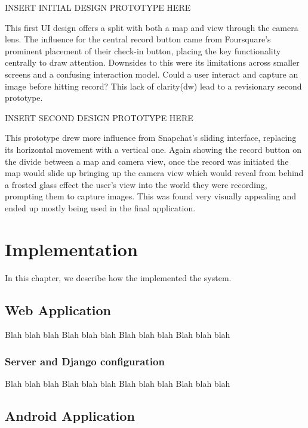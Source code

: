 \documentclass{l3proj}
\begin{document}
INSERT INITIAL DESIGN PROTOTYPE HERE

This first UI design offers a split with both a map and view through the camera
lens. The influence for the central record button came from Foursquare’s
prominent placement of their check-in button, placing the key functionality
centrally to draw attention. Downsides to this were its limitations across
smaller screens and a confusing interaction model. Could a user interact and
capture an image before hitting record? This lack of clarity(dw) lead to a
revisionary second prototype.

INSERT SECOND DESIGN PROTOTYPE HERE

This prototype drew more influence from Snapchat’s sliding interface, replacing
its horizontal movement with a vertical one. Again showing the record button on
the divide between a map and camera view, once the record was initiated the map
would slide up bringing up the camera view which would reveal from behind a
frosted glass effect the user’s view into the world they were recording,
prompting them to capture images. This was found very visually appealing and
ended up mostly being used in the final application.


\chapter{Implementation}
\label{impl}

In this chapter, we describe how the implemented the system.

\section{Web Application}

Blah blah blah
Blah blah blah
Blah blah blah
Blah blah blah

\subsection{Server and Django configuration}

Blah blah blah
Blah blah blah
Blah blah blah
Blah blah blah

\section{Android Application}
\end{document}
